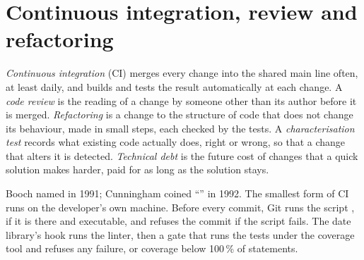 \section{Continuous integration, review and refactoring}\label{sec:b3:software-engineering:process}

\begin{definition}\label{def:b3:software-engineering:process}
\emph{Continuous integration} (CI) merges every change into the shared main line often, at least daily, and builds and tests the result automatically at each change. A \emph{code review} is the reading of a change by someone other than its author before it is merged. \emph{Refactoring} is a change to the structure of code that does not change its behaviour, made in small steps, each checked by the tests. A \emph{characterisation test} records what existing code actually does, right or wrong, so that a change that alters it is detected. \emph{Technical debt} is the future cost of changes that a quick solution makes harder, paid for as long as the solution stays.
\end{definition}

Booch named  in 1991; Cunningham coined ``'' in 1992. %
The smallest form of CI runs on the developer's own machine. Before every commit, Git runs the script , if it is there and executable, and refuses the commit if the script fails. %
The date library's hook runs the linter, then a gate that runs the tests under the coverage tool and refuses any failure, or coverage below 100\,\% of statements.

\label{out:b3:software-engineering:ci}

